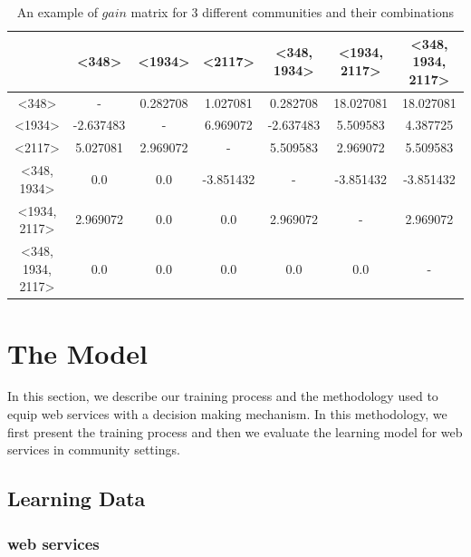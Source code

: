 \documentclass[10pt,journal,cspaper,compsoc]{IEEEtran}
\begin{document}
\begin{table}[ht]
\caption{An example of $gain$ matrix for 3 different communities and their combinations} %
\centering %
{\renewcommand{\arraystretch}{1.2}
\begin{tabular}{c|c c c c c c} %
\hline\hline %
 & \textless348\textgreater & \textless1934\textgreater & \textless2117\textgreater & \textless348, 1934\textgreater & \textless1934, 2117\textgreater & \textless348, 1934, 2117\textgreater \\ [0.5ex] %
\hline %
\textless348\textgreater & - & 0.282708 & 1.027081 & 0.282708 & 18.027081 & 18.027081 \\
\textless1934\textgreater & -2.637483 & - & 6.969072 & -2.637483 & 5.509583 & 4.387725 \\
\textless2117\textgreater & 5.027081 & 2.969072 & - & 5.509583 & 2.969072 & 5.509583 \\
\textless348, 1934\textgreater & 0.0 & 0.0 & -3.851432 & - & -3.851432 & -3.851432 \\
\textless1934, 2117\textgreater & 2.969072 & 0.0 & 0.0 & 2.969072 & - & 2.969072 \\
\textless348, 1934, 2117\textgreater & 0.0 & 0.0 & 0.0 & 0.0 & 0.0 & - \\ [1ex] %
\hline %
\end{tabular}
}
\label{table:nonlin} %
\end{table}

\section{The Model}\label{s:model}

In this section, we describe our training process and the methodology used to equip web services with a decision making mechanism. In this methodology, we first present the training process and then we evaluate the learning model for web services in community settings.

\subsection{Learning Data}\label{ss:learningdata}

\subsubsection{web services}\label{sss:webservices}
\end{document}
